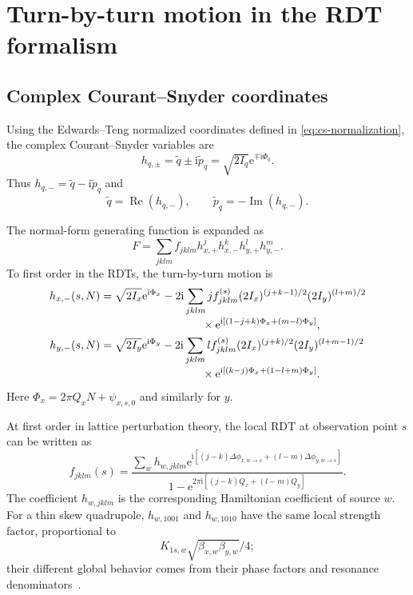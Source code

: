 \documentclass[11pt,a4paper]{article}
\newcommand{\ii}{\mathrm{i}}
\newcommand{\e}{\mathrm{e}}
\newcommand{\Ree}{\operatorname{Re}}
\newcommand{\Imm}{\operatorname{Im}}
\begin{document}
\section{Turn-by-turn motion in the RDT formalism}
\label{sec:rdt}

\subsection{Complex Courant--Snyder coordinates}

Using the Edwards--Teng normalized coordinates defined in
\cref{eq:cs-normalization}, the complex Courant--Snyder variables are
\begin{equation}
 h_{q,\pm}=\widetilde q\pm\ii\widetilde p_q
 =\sqrt{2I_q}\e^{\mp\ii\Phi_q}.
 \label{eq:complex-cs}
\end{equation}
Thus $h_{q,-}=\widetilde q-\ii\widetilde p_q$ and
\begin{equation}
 \widetilde q=\Ree(h_{q,-}),
 \qquad
 \widetilde p_q=-\Imm(h_{q,-}).
\end{equation}

The normal-form generating function is expanded as
\begin{equation}
 F=\sum_{jklm}f_{jklm}
 h_{x,+}^{j}h_{x,-}^{k}h_{y,+}^{l}h_{y,-}^{m}.
\end{equation}
To first order in the RDTs, the turn-by-turn motion is
\begin{align}
 h_{x,-}(s,N)
 &=\sqrt{2I_x}\e^{\ii\Phi_x}
 -2\ii\sum_{jklm}j f_{jklm}^{(s)}
 (2I_x)^{(j+k-1)/2}(2I_y)^{(l+m)/2}
 \nonumber\\[-0.2em]
 &\hspace{3.2cm}\times
 \e^{\ii[(1-j+k)\Phi_x+(m-l)\Phi_y]},
 \label{eq:general-hx-rdt}\\
 h_{y,-}(s,N)
 &=\sqrt{2I_y}\e^{\ii\Phi_y}
 -2\ii\sum_{jklm}l f_{jklm}^{(s)}
 (2I_x)^{(j+k)/2}(2I_y)^{(l+m-1)/2}
 \nonumber\\[-0.2em]
 &\hspace{3.2cm}\times
 \e^{\ii[(k-j)\Phi_x+(1-l+m)\Phi_y]}.
 \label{eq:general-hy-rdt}
\end{align}
Here $\Phi_x=2\pi Q_xN+\psi_{x,s,0}$ and similarly for $y$.

At first order in lattice perturbation theory, the local RDT at observation point $s$ can be written as
\begin{equation}
 f_{jklm}(s)=
 \frac{
  \displaystyle\sum_{w}h_{w,jklm}
  \e^{\ii[(j-k)\Delta\phi_{x,w\to s}+(l-m)\Delta\phi_{y,w\to s}]}
 }{
  1-\e^{2\pi\ii[(j-k)Q_x+(l-m)Q_y]}
 }.
 \label{eq:general-local-rdt}
\end{equation}
The coefficient $h_{w,jklm}$ is the corresponding Hamiltonian coefficient of source $w$.  For a thin skew quadrupole, $h_{w,1001}$ and $h_{w,1010}$ have the same local strength factor, proportional to
\[
 K_{1s,w}\sqrt{\beta_{x,w}\beta_{y,w}}/4;
\]
their different global behavior comes from their phase factors and resonance denominators~\cite{XsuiteManual}.
\end{document}
